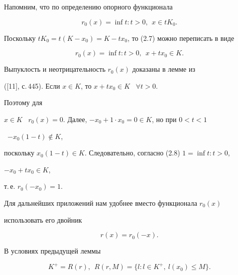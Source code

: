  


\begin{pf} 


Напомним, что по определению опорного функционала 


\begin{equation} 


r_0(x)=\inf t:t>0,\ \ x\in t K_0. 


\end{equation} 


Поскольку $t K_0=t(K-x_0)=K-t x_0$, то (2.7) можно переписать в виде


\begin{equation} 


r_0(x)=\inf t:t>0,\ \ x+t x_0\in K. 


\end{equation} 


Выпуклость и неотрицательность $r_0(x)$ доказаны в лемме из


([11], с.\,445). Если $x\in K$, то $x+t x_0\in K$ \ $\forall t>0$. 


Поэтому для 


$x\in K$ \ $r_0(x)=0$. Далее, $-x_0+1\cdot x_0=0\in K$, но при $0<t<1$ 


\ $-x_0(1-t)\notin K$, 


поскольку $x_0(1-t)\in K$. Следовательно, согласно (2.8) $1=\inf t:t>0$, 


$-x_0+t x_0\in K$, 


т.\,е. $r_0(-x_0)=1$. 


\end{pf} 


 


Для дальнейших приложений нам удобнее вместо функционала $r_0(x)$ 


использовать его двойник 


\begin{equation} 


r(x)=r_0(-x). 


\end{equation} 


 


\begin{lems} 


В условиях предыдущей леммы 


\begin{equation} 


K^+=R(r),\ \ R(r,M)=\{l:l\in K^+,\ l(x_0)\le M\}. 


\end{equation} 


\end{lems} 


